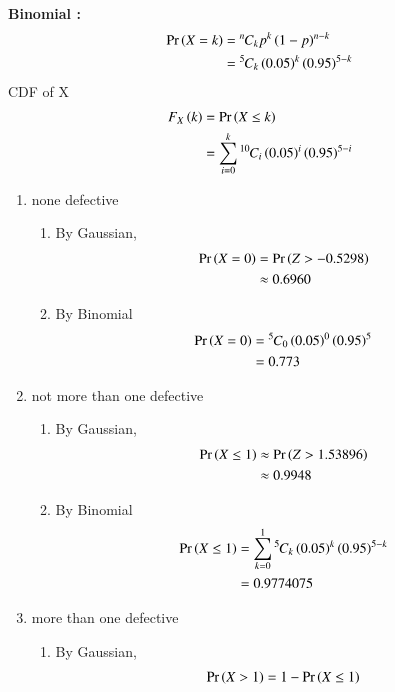 \documentclass[article]{IEEEtran}
\theoremstyle{remark}
\begin{document}
\textbf{Binomial :}
\begin{align}
	\Pr\left(X=k\right)&={{}^{n}\mkern-1muC_{k}}p^k\left(1-p\right)^{n-k}\\
	&={{}^{5}\mkern-1muC_{k}}\left(0.05\right)^k\left(0.95\right)^{5-k}
\end{align}
CDF of X
\begin{align}
	F_X\left(k\right)&=\Pr\left(X \leq k\right)\\
	&=\sum_{i=0}^{k}{{}^{10}\mkern-1muC_{i}}\left(0.05\right)^i\left(0.95\right)^{5-i}
\end{align}
\begin{enumerate}
	\item none defective\\
	\begin{enumerate}
		\item By Gaussian,\\
		\begin{align}
			\Pr\left(X = 0\right) &= \Pr\left(Z > -0.5298\right)\\
			&\approx 0.6960 
		\end{align}
		\item By Binomial
		\begin{align}
			\Pr\left(X = 0\right) &= {{}^{5}\mkern-1muC_{0}}\left(0.05\right)^0\left(0.95\right)^{5}\\
			&= 0.773
		\end{align}	
	\end{enumerate}
	\item not more than one defective\\
	\begin{enumerate}
		\item By Gaussian,\\
		\begin{align}
			\Pr\left(X \leq 1\right) &\approx \Pr\left(Z > 1.53896\right)\\
			&\approx 0.9948
		\end{align}
		\item By Binomial
		\begin{align}
			\Pr\left(X \leq 1\right) &= \sum_{k=0}^{1}{{}^{5}\mkern-1muC_{k}}\left(0.05\right)^k\left(0.95\right)^{5-k}\\
			&= 0.9774075
		\end{align}
	\end{enumerate}
	\item more than one defective\\
	\begin{enumerate}
		\item By Gaussian,\\
		\begin{align}
			\pr{X > 1} &= 1 - \pr{X \leq 1}\\

\end{align}
\end{enumerate}
\end{enumerate}
\end{document}
